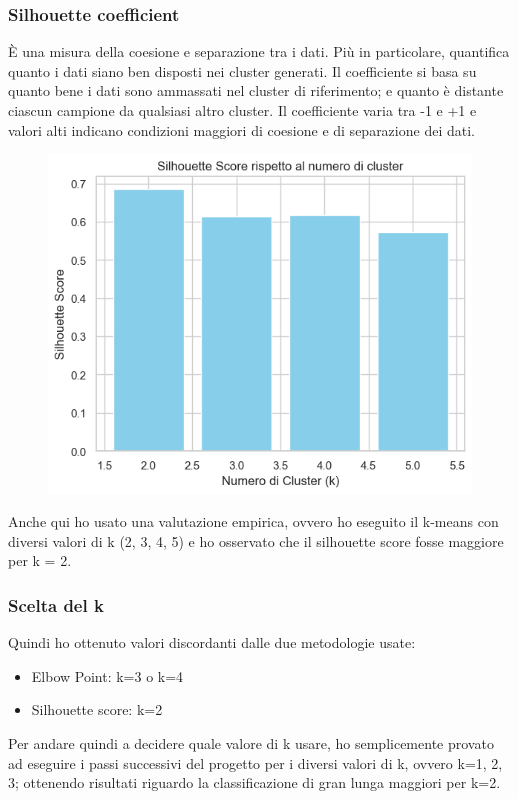 \documentclass[]{article}
\begin{document}
            \subsubsection{Silhouette coefficient}
                È una misura della coesione e separazione tra i dati. Più in particolare, quantifica quanto i dati siano ben disposti nei cluster generati. Il coeﬃciente si basa su quanto bene i dati sono ammassati nel cluster di riferimento; e quanto è distante ciascun campione da qualsiasi altro cluster. Il coeﬃciente varia tra -1 e +1 e valori alti indicano condizioni maggiori di coesione e di separazione dei dati.
                \begin{figure}[H]
                    \centering
                    \includegraphics[width=0.6\linewidth]{images/silhouetteScores.png}
                    \label{fig:enter-label}
                \end{figure}
                Anche qui ho usato una valutazione empirica, ovvero ho eseguito il k-means con diversi valori di k (2, 3, 4, 5) e ho osservato che il silhouette score fosse maggiore per k = 2.

            \subsubsection{Scelta del k}
                Quindi ho ottenuto valori discordanti dalle due metodologie usate:
                \begin{itemize}
                    \item Elbow Point: k=3 o k=4
                    \item Silhouette score: k=2
                \end{itemize}
                Per andare quindi a decidere quale valore di k usare, ho semplicemente provato ad eseguire i passi successivi del progetto per i diversi valori di k, ovvero k=1, 2, 3; ottenendo risultati riguardo la classificazione di gran lunga maggiori per k=2.\\
\end{document}
